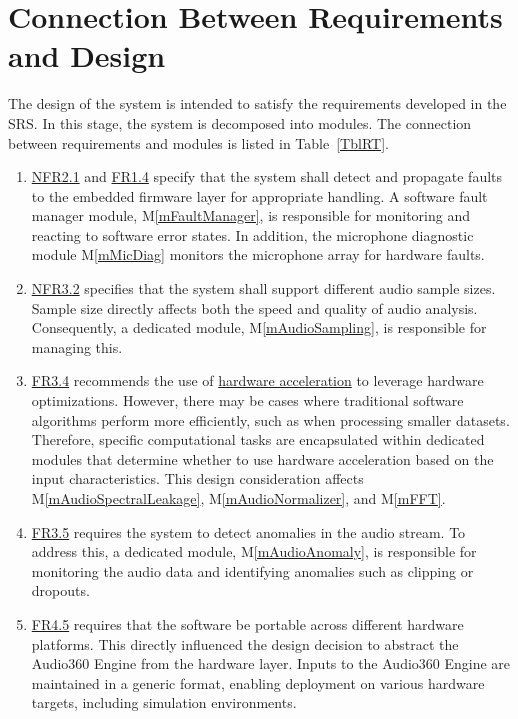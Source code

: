 \documentclass[12pt, titlepage]{article}
\newcommand{\mref}[1]{M\ref{#1}}
\begin{document}
\section{Connection Between Requirements and Design} \label{SecConnection}

The design of the system is intended to satisfy the requirements developed in
the SRS. In this stage, the system is decomposed into modules. The connection
between requirements and modules is listed in Table~\ref{TblRT}.

\begin{enumerate}

\item \hyperref[SRS-NFR2_1]{NFR2.1} and \hyperref[SRS-FR1_4]{FR1.4} specify that
the system shall detect and propagate faults to the embedded firmware layer for
appropriate handling. A software fault manager module, \mref{mFaultManager}, is
responsible for monitoring and reacting to software error states. In addition,
the microphone diagnostic module \mref{mMicDiag} monitors the microphone array
for hardware faults.

\item \hyperref[SRS-NFR3_3]{NFR3.2} specifies that the system shall support
  different audio sample sizes. Sample size directly affects both the speed and
  quality of audio analysis. Consequently, a dedicated module,
  \mref{mAudioSampling}, is responsible for managing this.

\item \hyperref[SRS-FR3_4]{FR3.4} recommends the use of
  \hyperref[SRS-def:hardware_acceleration]{hardware acceleration} to leverage
  hardware optimizations. However, there may be cases where traditional software
  algorithms perform more efficiently, such as when processing smaller datasets.
  Therefore, specific computational tasks are encapsulated within dedicated
  modules that determine whether to use hardware acceleration based on the input
  characteristics. This design consideration affects
  \mref{mAudioSpectralLeakage}, \mref{mAudioNormalizer}, and \mref{mFFT}.

\item \hyperref[SRS-FR3_5]{FR3.5} requires the system to detect anomalies in the
audio stream. To address this, a dedicated module, \mref{mAudioAnomaly}, is
responsible for monitoring the audio data and identifying anomalies such as
clipping or dropouts.

\item \hyperref[SRS-FR4_5]{FR4.5} requires that the software be portable across
  different hardware platforms. This directly influenced the design decision to
  abstract the Audio360 Engine from the hardware layer. Inputs to the Audio360
  Engine are maintained in a generic format, enabling deployment on various
  hardware targets, including simulation environments.


\end{enumerate}
\end{document}

